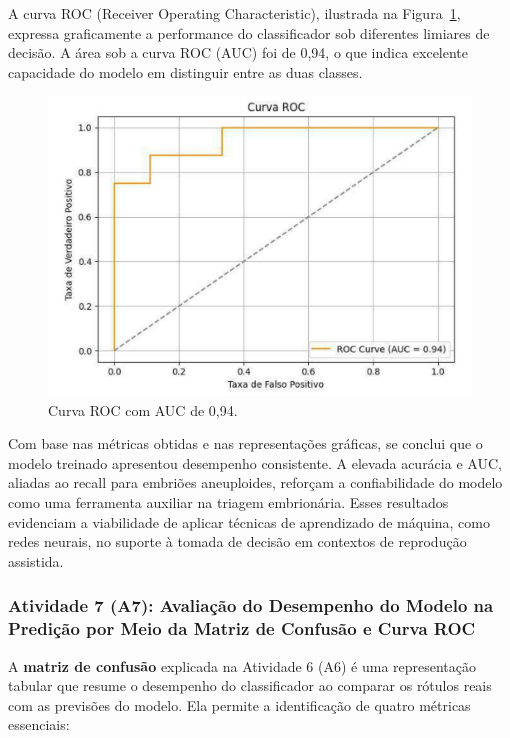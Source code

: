 A curva ROC (Receiver Operating Characteristic), ilustrada na Figura~\ref{fig:curvaRoc}, expressa graficamente a performance do classificador sob diferentes limiares de decisão. A área sob a curva ROC (AUC) foi de 0,94, o que indica excelente capacidade do modelo em distinguir entre as duas classes.

\begin{figure}[h]
    \captionsetup{font=footnotesize, justification=centering, labelsep=period, position=above}
    \caption{Curva ROC com AUC de 0,94.}
    \label{fig:curvaRoc}
    \centering
    \includegraphics[scale=0.4]{figuras/IA/curvaRoc.pdf}
\end{figure}
\FloatBarrier

Com base nas métricas obtidas e nas representações gráficas, se conclui que o modelo treinado apresentou desempenho consistente. A elevada acurácia e AUC, aliadas ao recall para embriões aneuploides, reforçam a confiabilidade do modelo como uma ferramenta auxiliar na triagem embrionária. Esses resultados evidenciam a viabilidade de aplicar técnicas de aprendizado de máquina, como redes neurais, no suporte à tomada de decisão em contextos de reprodução assistida.

\subsubsection{Atividade 7 (A7): Avaliação do Desempenho do Modelo na Predição por Meio da Matriz de Confusão e Curva ROC}
A \textbf{matriz de confusão} explicada na Atividade 6 (A6) é uma representação tabular que resume o desempenho do classificador ao comparar os rótulos reais com as previsões do modelo. Ela permite a identificação de quatro métricas essenciais:

